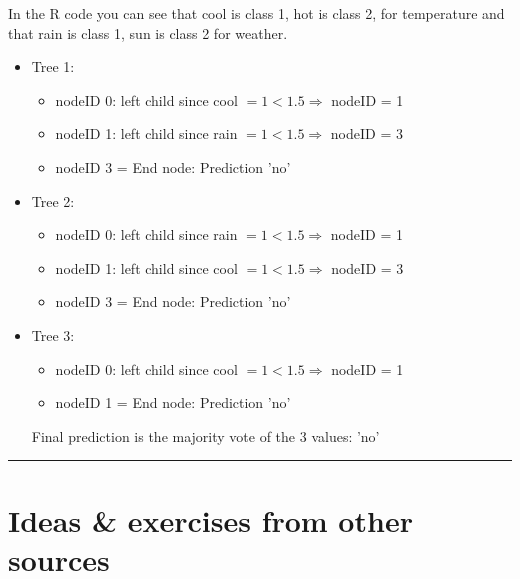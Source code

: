 \documentclass[a4paper]{article}
\newcommand{\exinspo}
  {\color{black} \hrule \section{Ideas \& exercises from other sources}}
\begin{document}
{\begin{enumerate}
  In the R code you can see that cool is class 1, hot is class 2, for 
  temperature and that rain is class 1, sun is class 2 for weather.
  \begin{itemize}
    \item Tree 1: 
    \begin{itemize}
      \item nodeID 0: left child since cool $=1<1.5 \Rightarrow$ nodeID = 1
      \item nodeID 1: left child since rain $=1<1.5 \Rightarrow$ nodeID = 3
      \item nodeID 3 = End node: Prediction 'no'
    \end{itemize}
    \item Tree 2: 
    \begin{itemize}
      \item nodeID 0: left child since rain $=1<1.5 \Rightarrow$ nodeID = 1
      \item nodeID 1: left child since cool $=1<1.5 \Rightarrow$ nodeID = 3
      \item nodeID 3 = End node: Prediction 'no'
    \end{itemize}
    \item Tree 3: 
    \begin{itemize}
      \item nodeID 0: left child since cool $=1<1.5 \Rightarrow$ nodeID = 1
      \item nodeID 1 = End node: Prediction 'no'
    \end{itemize}
    Final prediction is the majority vote of the 3 values: 'no'
  \end{itemize}
\end{enumerate} 
}


\dlz
\exinspo
\end{document}
